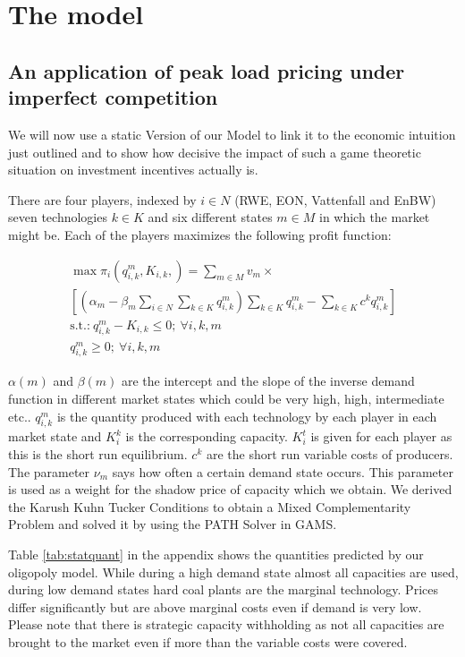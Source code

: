 \section{The model}


\subsection{An application of peak load pricing under imperfect competition}

We will now use a static Version of our Model to link it to the economic intuition just outlined and to show how decisive the impact of such a game theoretic situation on investment incentives actually is.

There are four players, indexed by $i\in N$ (RWE, EON, Vattenfall and EnBW) seven technologies $k\in K$  and six different states $m\in M$ in which the market might be. Each of the players maximizes the following profit function:

\begin{gather}
	\max \pi_i(q_{i,k}^m,K_{i,k},)= \sum_{m\in M} v_m\times\\\left[(\alpha_m-\beta_m\sum_{i\in N} \sum_{k\in K} q_{i,k}^m ) \sum_{k\in K} q_{i,k}^m - \sum_{k\in K} c^k q_{i,k}^m \right] \\
			\text{s.t.:} \  q_{i,k}^m-K_{i,k} \leq 0;\  \forall i,k,m \\  \nonumber
 										  q_{i,k}^m	\geq 0; \ \forall i,k,m   \nonumber
\end{gather}

$\alpha(m)$ and $\beta(m)$ are the intercept and the slope of the inverse demand function in different market states which could be very high, high, intermediate etc.. $q_{i,k}^m$ is the quantity produced with each technology by each player in each market state and $K_i^k$ is the corresponding capacity. $K_i^t$ is given for each player as this is the short run equilibrium. $c^k$ are the short run variable costs of producers. The parameter $\nu_m $ says how often a certain demand state occurs. This parameter is used as a weight for the shadow price of capacity which we obtain. We derived the Karush Kuhn Tucker Conditions to obtain a Mixed Complementarity Problem and solved it by using the PATH Solver in GAMS.

Table \ref{tab:statquant} in the appendix shows the quantities predicted by our oligopoly model. While during a high demand state almost all capacities are used, during low demand states hard coal plants are the marginal technology. Prices differ significantly but are above marginal costs even if demand is very low. Please note that there is strategic capacity withholding as not all capacities are brought to the market even if more than the variable costs were covered.

